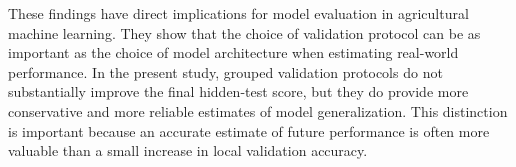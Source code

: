 These findings have direct implications for model evaluation in agricultural machine learning. They show that the choice of validation protocol can be as important as the choice of model architecture when estimating real-world performance. In the present study, grouped validation protocols do not substantially improve the final hidden-test score, but they do provide more conservative and more reliable estimates of model generalization. This distinction is important because an accurate estimate of future performance is often more valuable than a small increase in local validation accuracy.







